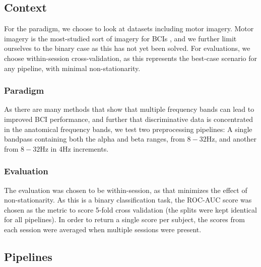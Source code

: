 \subsection{Context}
For the paradigm, we choose to look at datasets including motor
imagery.  Motor imagery is the most-studied sort of imagery for BCIs
\cite{Yuan2014}, and we further limit ourselves to the binary case as
this has not yet been solved. For evaluations, we choose
within-session cross-validation, as this represents the best-case
scenario for any pipeline, with minimal non-stationarity. 

\subsubsection{Paradigm}

As there are many methods that show that multiple frequency bands can
lead to improved BCI performance\cite{KaiKengAng2008}, and further
that discriminative data is concentrated in the anatomical frequency
bands, we test two preprocessing pipelines: A single bandpass
containing both the alpha and beta ranges, from $8-32\text{Hz}$, and
another from $8-32\text{Hz}$ in 4Hz increments.

\subsubsection{Evaluation}
The evaluation was chosen to be within-session, as that minimizes the
effect of non-stationarity. As this is a binary classification task,
the ROC-AUC score was chosen as the metric to score 5-fold cross
validation (the splits were kept identical for all pipelines). In
order to return a single score per subject, the scores from each
session were averaged when multiple sessions were present.

\subsection{Pipelines}

